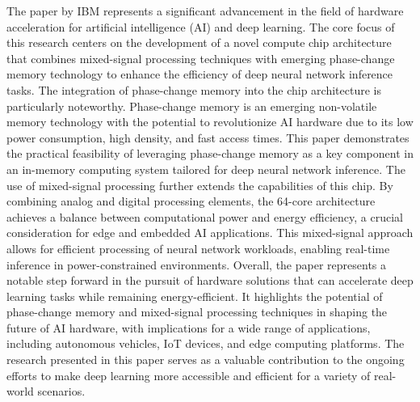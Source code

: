 \documentclass[nohyperref]{article}
\theoremstyle{plain}
\theoremstyle{definition}
\theoremstyle{remark}
\begin{document}
The paper by IBM \cite{le202364} represents a significant advancement in the field of hardware acceleration for artificial intelligence (AI) and deep learning. The core focus of this research centers on the development of a novel compute chip architecture that combines mixed-signal processing techniques with emerging phase-change memory technology to enhance the efficiency of deep neural network inference tasks.
The integration of phase-change memory into the chip architecture is particularly noteworthy. Phase-change memory is an emerging non-volatile memory technology with the potential to revolutionize AI hardware due to its low power consumption, high density, and fast access times. This paper demonstrates the practical feasibility of leveraging phase-change memory as a key component in an in-memory computing system tailored for deep neural network inference.
The use of mixed-signal processing further extends the capabilities of this chip. By combining analog and digital processing elements, the 64-core architecture achieves a balance between computational power and energy efficiency, a crucial consideration for edge and embedded AI applications. This mixed-signal approach allows for efficient processing of neural network workloads, enabling real-time inference in power-constrained environments.
Overall, the paper represents a notable step forward in the pursuit of hardware solutions that can accelerate deep learning tasks while remaining energy-efficient. It highlights the potential of phase-change memory and mixed-signal processing techniques in shaping the future of AI hardware, with implications for a wide range of applications, including autonomous vehicles, IoT devices, and edge computing platforms. The research presented in this paper serves as a valuable contribution to the ongoing efforts to make deep learning more accessible and efficient for a variety of real-world scenarios.
\end{document}
